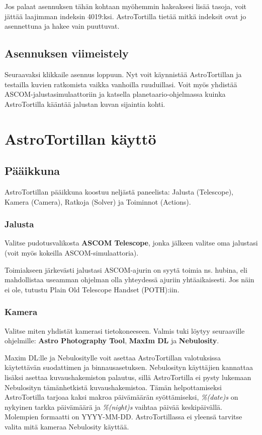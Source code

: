 \documentclass{article}
\begin{document}
Jos palaat asennuksen tähän kohtaan myöhemmin hakeaksesi lisää tasoja, voit jättää laajimman indeksin 4019:ksi. 
AstroTortilla tietää mitkä indeksit ovat jo asennettuna ja hakee vain puuttuvat.

\subsection{Asennuksen viimeistely}

Seuraavaksi klikkaile asennus loppuun. Nyt voit käynnistää AstroTortillan ja testailla kuvien ratkomista vaikka vanhoilla ruuduillasi.
Voit myös yhdistää ASCOM-jalustasimulaattoriin ja katsella planetaario-ohjelmassa kuinka AstroTortilla kääntää jalustan kuvan sijaintia kohti.

\section{AstroTortillan käyttö}

\subsection{Pääikkuna}

AstroTortillan pääikkuna koostuu neljästä paneelista: Jalusta (Telescope), Kamera (Camera), Ratkoja (Solver) ja Toiminnot (Actions).

\subsubsection{Jalusta}

Valitse pudotusvalikosta \textbf{ASCOM Telescope}, jonka jälkeen valitse oma jalustasi (voit myös kokeilla ASCOM-simulaattoria).

Toimiakseen järkevästi jalustasi ASCOM-ajurin on syytä toimia ns. hubina, 
eli mahdollistaa useamman ohjelman olla yhteydessä ajuriin yhtäaikaisesti.
Jos näin ei ole, tutustu Plain Old Telescope Handset (POTH):iin.

\subsubsection{Kamera}

Valitse miten yhdistät kamerasi tietokoneeseen. Valmis tuki löytyy seuraaville ohjelmille: \textbf{Astro Photography Tool}, \textbf{MaxIm DL} ja \textbf{Nebulosity}. 

Maxim DL:lle ja Nebulositylle voit asettaa AstroTortillan valotuksissa käytettävän suodattimen ja binnausasetuksen. Nebulosityn käyttäjien kannattaa lisäksi asettaa kuvaushakemiston palautus, sillä AstroTortilla ei pysty lukemaan Nebulosityn tämänhetkistä kuvaushakemistoa. Tämän helpottamiseksi AstroTortilla tarjoaa kaksi makroa päivämäärän syöttämiseksi, \textit{\%(date)s} on nykyinen tarkka päivämäärä ja \textit{\%(night)s} vaihtaa päivää keskipäivällä. Molempien formaatti on YYYY-MM-DD. AstroTortillassa ei yleensä tarvitse valita mitä kameraa Nebulosity käyttää.
\end{document}
